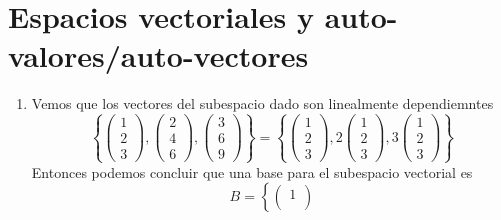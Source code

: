 \documentclass[12pt, letterpaper]{article}
\begin{document}
\newpage

\section{Espacios vectoriales y auto-valores/auto-vectores}
\begin{enumerate}
    \item Vemos que los vectores del subespacio dado son linealmente dependiemntes
    \begin{equation*}
        \left\{
            \begin{pmatrix}
                1 \\
                2 \\
                3
            \end{pmatrix},
            \begin{pmatrix}
                2 \\
                4 \\
                6
            \end{pmatrix},
            \begin{pmatrix}
                3 \\
                6 \\
                9
            \end{pmatrix}
        \right\}
        =
        \left\{
            \begin{pmatrix}
                1 \\
                2 \\
                3
            \end{pmatrix},
            2
            \begin{pmatrix}
                1 \\
                2 \\
                3
            \end{pmatrix},
            3
            \begin{pmatrix}
                1 \\
                2 \\
                3
            \end{pmatrix}
        \right\}
    \end{equation*}
    Entonces podemos concluir que una base para el subespacio vectorial es
    \begin{equation*}
        B =
        \left\{
            \begin{pmatrix}
                1 \\

\end{pmatrix}
\end{equation*}
\end{enumerate}
\end{document}

